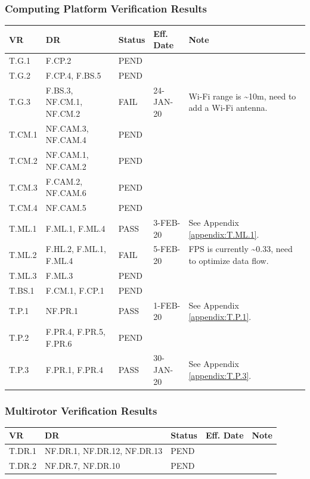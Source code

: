 \documentclass[10pt,letterpaper]{article}
\begin{document}
\subsubsection{Computing Platform Verification Results}
\begin{table}[H]
	\centering
	\begin{tabular}{lllll}
	\hline
	\textbf{VR} & \textbf{DR} & \textbf{Status} & \textbf{Eff. Date} & \textbf{Note}\\
	\hline
	T.G.1 & F.CP.2 & PEND   & \\
	T.G.2 & F.CP.4, F.BS.5 & PEND   & \\
	T.G.3 & F.BS.3, NF.CM.1, NF.CM.2 & FAIL   & 24-JAN-20 & Wi-Fi range is \textasciitilde 10m, need to add a Wi-Fi antenna. \\
	\hline
	T.CM.1 & NF.CAM.3, NF.CAM.4   & PEND   & \\
	T.CM.2 & NF.CAM.1, NF.CAM.2   & PEND   & \\
	T.CM.3 & F.CAM.2, NF.CAM.6   & PEND   & \\
	T.CM.4 & NF.CAM.5   & PEND   & \\
	\hline
	T.ML.1 & F.ML.1, F.ML.4 & PASS & 3-FEB-20 & See Appendix \ref{appendix:T.ML.1}.\\
	T.ML.2 & F.HL.2, F.ML.1, F.ML.4 & FAIL  & 5-FEB-20 & FPS is currently \textasciitilde 0.33, need to optimize data flow. \\
    T.ML.3 & F.ML.3 & PEND   & \\
    \hline
    T.BS.1 & F.CM.1, F.CP.1 & PEND   & \\
    \hline
    T.P.1 & NF.PR.1 & PASS   & 1-FEB-20 & See Appendix \ref{appendix:T.P.1}.\\
    T.P.2 & F.PR.4, F.PR.5, F.PR.6 & PEND   & \\
    T.P.3 & F.PR.1, F.PR.4 & PASS   & 30-JAN-20 & See Appendix \ref{appendix:T.P.3}. \\
	\hline
	\end{tabular}
\end{table}

\subsubsection{Multirotor Verification Results}
\begin{table}[H]
	\centering
	\begin{tabular}{lllll}
	\hline
	\textbf{VR} & \textbf{DR} & \textbf{Status} & \textbf{Eff. Date} & \textbf{Note}\\
	\hline
    T.DR.1 & NF.DR.1, NF.DR.12, NF.DR.13  & PEND   & \\
	T.DR.2 & NF.DR.7, NF.DR.10 & PEND   & \\
	\hline
	\end{tabular}
\end{table}
\end{document}
